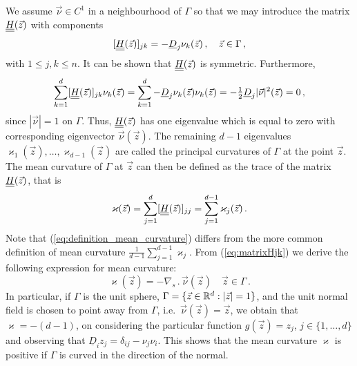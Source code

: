 We assume $\vec \nu \in C^1$ in a neighbourhood of $\Gamma$ so that we
may introduce the matrix $\mat H(\vec z)$ with components
\begin{equation}\label{eq:matrixHjk}
[\mat H (\vec z)]_{jk} = - \underline{D}_j \nu_k (\vec z)\,, \quad \vec z \in
\Gamma \, ,
\end{equation}
with $1\leq j,k\leq n$. It can be shown that $\mat H(\vec z)$ is symmetric.
Furthermore,
\begin{equation}
\sum_{k = 1}^d [\mat H(\vec z)]_{jk} \nu_k (\vec z) =
\sum_{k = 1}^d - \underline{D}_j \nu_k (\vec z) \nu_k (\vec z) =
- \tfrac{1}{2} \underline{D}_j |\vec \nu|^2 (\vec z) = 0 \, ,
\end{equation}
since $|\vec \nu| = 1$ on $\Gamma$. Thus, $\mat H(\vec z)$ has one
eigenvalue which is equal to zero with corresponding eigenvector
$\vec\nu(\vec z)$. The remaining $d - 1$ eigenvalues $\varkappa_1 (\vec z),
\hdots, \varkappa_{d - 1} (\vec z)$ are called the principal curvatures of
$\Gamma$ at the point $\vec z$. The mean curvature of $\Gamma$ at $\vec z$
can then be defined as the trace of the matrix $\mat H(\vec z)$, that is
\begin{equation}\label{eq:definition_mean_curvature}
\varkappa (\vec z) = \sum_{j = 1}^d [\mat H(\vec z)]_{jj} = \sum_{j = 1}^{d -
1} \varkappa_j (\vec z) \,.
\end{equation}
Note that (\ref{eq:definition_mean_curvature}) differs from the more common
definition of mean curvature $\frac{1}{d - 1} \sum_{j = 1}^{d - 1} \varkappa_j$.
From (\ref{eq:matrixHjk}) we derive the following expression for mean
curvature:
\begin{equation}
\varkappa (\vec z)=-\nabla_s \,.\, \vec \nu(\vec z) \quad \vec z \in \Gamma\,.
\end{equation}
In particular, if $\Gamma$ is the unit sphere,
$\Gamma = \{ \vec z \in {\mathbb R}^d : |\vec z| = 1 \}$,
and the unit normal field is chosen to point away from $\Gamma$,
i.e.~$\vec\nu(\vec z) = \vec z$, we obtain that $\varkappa = -
(d - 1)$, on considering the particular function $g(\vec z) = z_j$, $j \in \{
1, \hdots, d \}$ and observing that $\underline{D}_i z_j = \delta_{ij} - \nu_j
\nu_i$. This shows that the mean curvature $\varkappa$ is positive if $\Gamma$
is curved in the direction of the normal.

